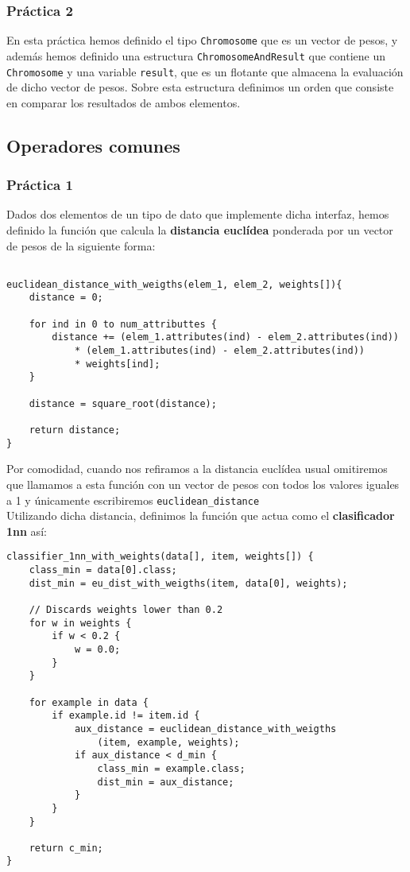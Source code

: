 \documentclass[size=a4, parskip=half, titlepage=false, toc=flat, toc=bib, 12pt]{scrartcl}
\begin{document}
\subsubsection{Práctica 2}
En esta práctica hemos definido el tipo \texttt{Chromosome} que es un vector de pesos, y además hemos definido una estructura \texttt{ChromosomeAndResult} que contiene un \texttt{Chromosome} y una variable \texttt{result}, que es un flotante que almacena la evaluación de dicho vector de pesos. Sobre esta estructura definimos un orden que consiste en comparar los resultados de ambos elementos.
\subsection{Operadores comunes}
\subsubsection{Práctica 1}
Dados dos elementos de un tipo de dato que implemente dicha interfaz, hemos definido la función que calcula la \textbf{distancia euclídea} ponderada por un vector de pesos de la siguiente forma:

\begin{verbatim}

euclidean_distance_with_weigths(elem_1, elem_2, weights[]){
    distance = 0;

    for ind in 0 to num_attributtes {
        distance += (elem_1.attributes(ind) - elem_2.attributes(ind))
            * (elem_1.attributes(ind) - elem_2.attributes(ind))
            * weights[ind];
    }

    distance = square_root(distance);

    return distance;
}

\end{verbatim}
Por comodidad, cuando nos refiramos a la distancia euclídea usual omitiremos que llamamos a esta función con un vector de pesos con todos los valores iguales a 1 y únicamente escribiremos \texttt{euclidean\_distance} \\

Utilizando dicha distancia, definimos la función que actua como el \textbf{clasificador 1nn} así:
\begin{verbatim}
classifier_1nn_with_weights(data[], item, weights[]) {
    class_min = data[0].class;
    dist_min = eu_dist_with_weigths(item, data[0], weights);

    // Discards weights lower than 0.2
    for w in weights {
        if w < 0.2 {
            w = 0.0;
        }
    }

    for example in data {
        if example.id != item.id {
            aux_distance = euclidean_distance_with_weigths
                (item, example, weights);
            if aux_distance < d_min {
                class_min = example.class;
                dist_min = aux_distance;
            }
        }
    }

    return c_min;
}

\end{verbatim}
\end{document}
